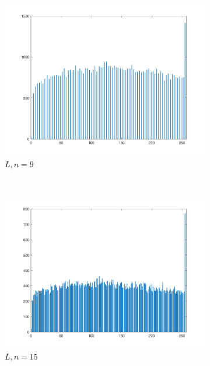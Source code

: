 \documentclass{article}
\begin{document}
\begin{enumerate}[label=(\alph*)]
\begin{figure}[!htb]
        \begin{subfigure}[b]{0.3\textwidth}
            \includegraphics[width=\textwidth]{img/hist_L9.png}
            \caption{$L, n = 9$}
        \end{subfigure}
        ~
        \begin{subfigure}[b]{0.3\textwidth}
            \includegraphics[width=\textwidth]{img/hist_L15.png}
            \caption{$L, n = 15$}
        \end{subfigure}
        ~
        \begin{subfigure}[b]{0.3\textwidth}

\end{subfigure}
\end{figure}
\end{enumerate}
\end{document}
